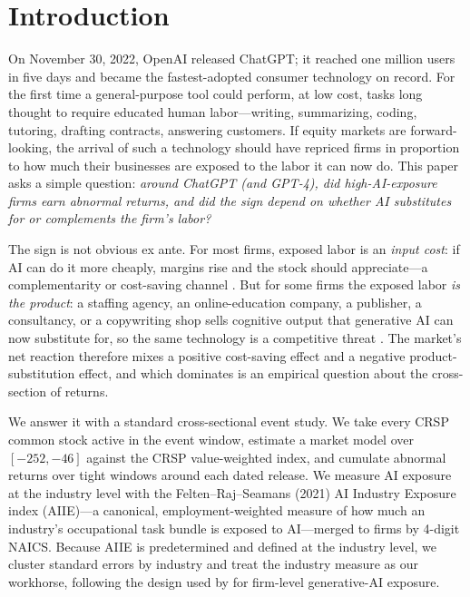 \documentclass[12pt]{article}
\begin{document}
\section{Introduction}
On November 30, 2022, OpenAI released ChatGPT; it reached one million users in five
days and became the fastest-adopted consumer technology on record. For the first time
a general-purpose tool could perform, at low cost, tasks long thought to require
educated human labor---writing, summarizing, coding, tutoring, drafting contracts,
answering customers. If equity markets are forward-looking, the arrival of such a
technology should have repriced firms in proportion to how much their businesses are
exposed to the labor it can now do. This paper asks a simple question: \emph{around
ChatGPT (and GPT-4), did high-AI-exposure firms earn abnormal returns, and did the
sign depend on whether AI substitutes for or complements the firm's labor?}

The sign is not obvious ex ante. For most firms, exposed labor is an \emph{input cost}:
if AI can do it more cheaply, margins rise and the stock should appreciate---a
complementarity or cost-saving channel \citep{brynjolfsson2023,noy2023}. But for some
firms the exposed labor \emph{is the product}: a staffing agency, an online-education
company, a publisher, a consultancy, or a copywriting shop sells cognitive output that
generative AI can now substitute for, so the same technology is a competitive threat
\citep{acemoglu2019,autor2003}. The market's net reaction therefore mixes a positive
cost-saving effect and a negative product-substitution effect, and which dominates is
an empirical question about the cross-section of returns.

We answer it with a standard cross-sectional event study. We take every CRSP common
stock active in the event window, estimate a market model over $[-252,-46]$ against the
CRSP value-weighted index, and cumulate abnormal returns over tight windows around each
dated release. We measure AI exposure at the industry level with the
Felten--Raj--Seamans (2021) AI Industry Exposure index (AIIE)---a canonical,
employment-weighted measure of how much an industry's occupational task bundle is
exposed to AI---merged to firms by 4-digit NAICS. Because AIIE is predetermined and
defined at the industry level, we cluster standard errors by industry and treat the
industry measure as our workhorse, following the design used by
\citet{eisfeldt2023} for firm-level generative-AI exposure.
\end{document}
